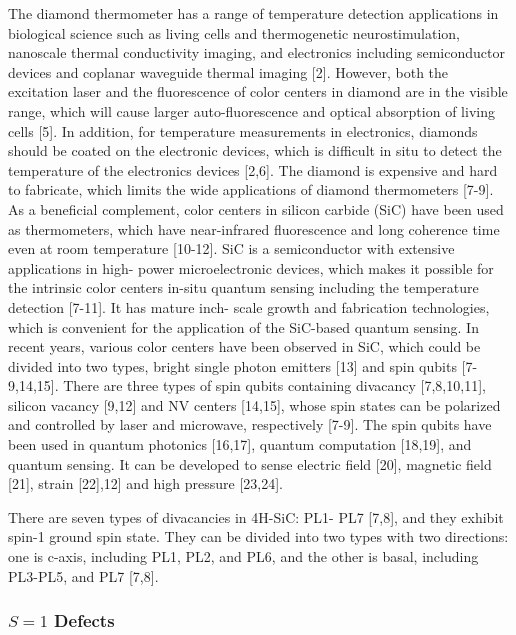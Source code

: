 {\color{edired}
The diamond thermometer
has a range of temperature detection applications in biological science such as living
cells and thermogenetic neurostimulation, nanoscale thermal conductivity imaging, and
electronics including semiconductor devices and coplanar waveguide thermal imaging
[2].
However, both the excitation laser and the fluorescence of color centers in diamond
are in the visible range, which will cause larger auto-fluorescence and optical absorption
of living cells [5]. In addition, for temperature measurements in electronics, diamonds
should be coated on the electronic devices, which is difficult in situ to detect the
temperature of the electronics devices [2,6]. The diamond is expensive and hard to
fabricate, which limits the wide applications of diamond thermometers [7-9]. As a
beneficial complement, color centers in silicon carbide (SiC) have been used as
thermometers, which have near-infrared fluorescence and long coherence time even at
room temperature [10-12]. SiC is a semiconductor with extensive applications in high-
power microelectronic devices, which makes it possible for the intrinsic color centers
in-situ quantum sensing including the temperature detection [7-11]. It has mature inch-
scale growth and fabrication technologies, which is convenient for the application of
the SiC-based quantum sensing.
In recent years, various color centers have been observed in SiC, which could be
divided into two types, bright single photon emitters [13] and spin qubits [7-9,14,15].
There are three types of spin qubits containing divacancy [7,8,10,11], silicon vacancy
[9,12] and NV centers [14,15], whose spin states can be polarized and controlled by
laser and microwave, respectively [7-9]. The spin qubits have been used in quantum
photonics [16,17], quantum computation [18,19], and quantum sensing. It can be
developed to sense electric field [20], magnetic field [21], strain [22],12] and high pressure [23,24]. 


There are seven types of divacancies in 4H-SiC: PL1- PL7 [7,8], and they exhibit
spin-1 ground spin state. They can be divided into two types with two directions: one
is c-axis, including PL1, PL2, and PL6, and the other is basal, including PL3-PL5, and
PL7 [7,8]. 
\cite{Qin-Yue}

}

\subsubsection{$S=1$ Defects}

